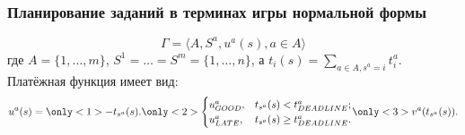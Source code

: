 \begin{frame}
	\frametitle{Планирование заданий в терминах игры нормальной формы}
	\begin{equation*}
		\Gamma = \langle A, S^a, u^a(s), a \in A \rangle
	\end{equation*}
	где $A = \{ 1, \ldots, m \}$, $S^1 = \ldots = S^m = \{ 1, \ldots, n \}$, а $t_i(s) = \sum\limits_{a \in A, s^a = i} t_i^a$. Платёжная функция имеет вид:
	\begin{equation*}
		u^a(s) = 
			\only<1>{-t_{s^a}(s).}
			\only<2>{
				\begin{cases}
					u^a_{GOOD}, &t_{s^a}(s) < t^a_{DEADLINE};\\
					u^a_{LATE}, &t_{s^a}(s) \ge t^a_{DEADLINE}.
				\end{cases}
			}
			\only<3>{v^a(t_{s^a}(s)).}
	\end{equation*}
\end{frame}

%
%

